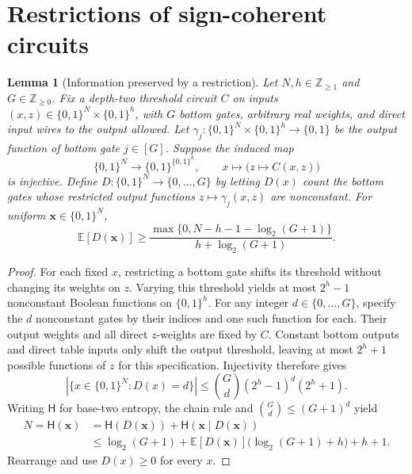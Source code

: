 \documentclass[11pt]{article}
\newtheorem{lemma}[theorem]{Lemma}
\newcommand{\bits}{\{0,1\}}
\begin{document}
\section{Restrictions of sign-coherent circuits}\label{sec:coherent}
\begin{lemma}[Information preserved by a restriction]\label{lem:entropy}
Let $N,h\in\mathbb Z_{\ge1}$ and $G\in\mathbb Z_{\ge0}$.
Fix a depth-two threshold circuit $C$ on inputs
$(x,z)\in\bits^N\times\bits^h$, with $G$ bottom gates, arbitrary real weights, and direct input wires
to the output allowed. Let $\gamma_j:\bits^N\times\bits^h\to\bits$
be the output function of bottom gate $j\in[G]$.
Suppose the induced map
$$\bits^N\longrightarrow\bits^{\bits^h},\qquad
x\longmapsto\bigl(z\longmapsto C(x,z)\bigr)$$
is injective. Define $D:\bits^N\to\{0,\ldots,G\}$ by letting $D(x)$
count the bottom gates whose restricted output functions
$z\mapsto\gamma_j(x,z)$ are nonconstant.
For uniform $\boldsymbol{x}\in\bits^N$,
$$
\mathbb E[D(\boldsymbol{x})]\ge
\frac{\max\{0,N-h-1-\log_2(G+1)\}}{h+\log_2(G+1)}.
$$
\end{lemma}
\begin{proof}
For each fixed $x$, restricting a bottom gate shifts its threshold
without changing its weights on $z$. Varying this threshold yields at
most $2^h-1$ nonconstant Boolean functions on $\bits^h$.
For any integer $d\in\{0,\ldots,G\}$, specify the $d$ nonconstant gates
by their indices and one such function for each. Their output weights
and all direct $z$-weights are fixed by $C$.
Constant bottom outputs and direct table inputs only shift the output
threshold, leaving at most $2^h+1$ possible functions of $z$ for this
specification. Injectivity therefore gives
$$|\{x\in\bits^N:D(x)=d\}|\le\binom Gd(2^h-1)^d(2^h+1).$$
Writing $\mathsf H$ for base-two entropy, the chain rule and
$\binom Gd\le(G+1)^d$ yield
\begin{align*}
N=\mathsf H(\boldsymbol{x})
 &=\mathsf H(D(\boldsymbol{x}))+\mathsf H(\boldsymbol{x}\mid D(\boldsymbol{x}))\\
 &\le\log_2(G+1)+\mathbb E[D(\boldsymbol{x})]
       \bigl(\log_2(G+1)+h\bigr)+h+1.
\end{align*}
Rearrange and use $D(x)\ge0$ for every $x$.
\end{proof}
\end{document}
